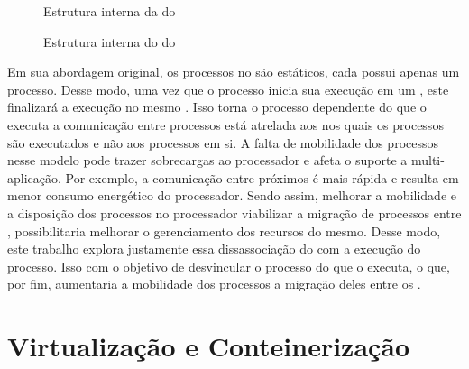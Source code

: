 \begin{figure}[bt]
    \centering
    
    \caption{Estrutura interna da \hal do \nanvix \cite{penna:thesis}}\label{fig.hal-overview}
\end{figure}

\begin{figure}[bt]
    \centering
    
    \caption{Estrutura interna do \microkernel do \nanvix \cite{penna:thesis}}\label{fig.microkernel-overview}
\end{figure}

Em sua abordagem original, os processos no \nanvix são estáticos, \ie cada \cluster possui apenas um processo. Desse modo, uma vez que o processo inicia sua execução em um \cluster, este finalizará a execução no mesmo \cluster. 
Isso torna o processo dependente do \cluster que o executa \eg a comunicação entre processos está atrelada aos \clusters nos quais os processos são executados e não aos processos em si. A falta de mobilidade dos processos nesse modelo pode trazer sobrecargas ao processador e afeta o suporte a multi-aplicação. Por exemplo, a comunicação entre \clusters próximos é mais rápida e resulta em menor consumo energético do processador. Sendo assim, melhorar a mobilidade e a disposição dos processos no processador \ie viabilizar a migração de processos entre \clusters, possibilitaria melhorar o gerenciamento dos recursos do mesmo. Desse modo, este trabalho explora justamente essa dissassociação do \hardware com a execução do processo. Isso com o objetivo de desvincular o processo do \cluster que o executa, o que, por fim, aumentaria a mobilidade dos processos \ie a migração deles entre os \clusters.

\section{Virtualização e Conteinerização}
\label{sec.virtualizacao}
